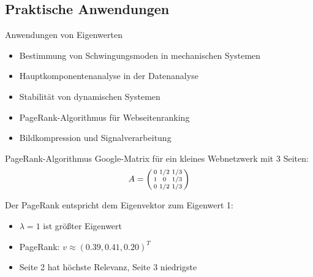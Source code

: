 \subsection{Praktische Anwendungen}

\begin{concept}{Anwendungen von Eigenwerten}
\begin{itemize}
    \item Bestimmung von Schwingungsmoden in mechanischen Systemen
    \item Hauptkomponentenanalyse in der Datenanalyse
    \item Stabilität von dynamischen Systemen
    \item PageRank-Algorithmus für Webseitenranking
    \item Bildkompression und Signalverarbeitung
\end{itemize}
\end{concept}

\begin{example2}{PageRank-Algorithmus}
Google-Matrix für ein kleines Webnetzwerk mit 3 Seiten:
$$A = \begin{psmallmatrix}
0 & 1/2 & 1/3\\
1 & 0 & 1/3\\
0 & 1/2 & 1/3
\end{psmallmatrix}$$

Der PageRank entspricht dem Eigenvektor zum Eigenwert 1:
\begin{itemize}
    \item $\lambda = 1$ ist größter Eigenwert
    \item PageRank: $v \approx (0.39, 0.41, 0.20)^T$
    \item Seite 2 hat höchste Relevanz, Seite 3 niedrigste
\end{itemize}
\end{example2}

